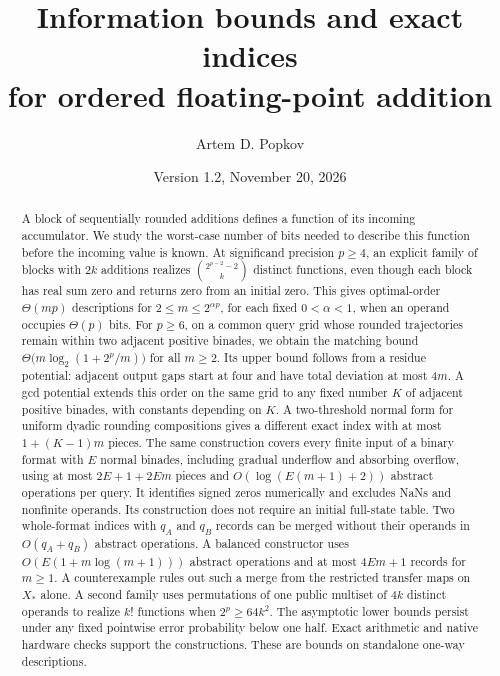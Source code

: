 \documentclass[11pt,reqno]{amsart}
\title[Ordered floating-point addition]{Information bounds and exact indices\protect\\ for ordered floating-point addition}
\author{Artem D. Popkov}
\date{Version 1.2, November 20, 2026}
\theoremstyle{definition}
\theoremstyle{remark}
\numberwithin{equation}{section}
\begin{document}
\raggedbottom

\begin{abstract}
A block of sequentially rounded additions defines a function of its incoming
accumulator. We study the worst-case number of bits needed to describe this
function before the incoming value is known. At significand precision $p\ge4$,
an explicit family of blocks with $2k$ additions realizes
$\binom{2^{p-2}-2}{k}$ distinct functions, even though each block has real sum
zero and returns zero from an initial zero. This gives optimal-order
$\Theta(mp)$ descriptions for $2\le m\le 2^{\alpha p}$, for each fixed
$0<\alpha<1$, when an operand occupies $\Theta(p)$ bits. For $p\ge6$, on a common query
grid whose rounded trajectories remain within two adjacent positive binades,
we obtain the matching bound $\Theta\bigl(m\log_2(1+2^p/m)\bigr)$ for all
$m\ge2$. Its upper bound follows from a residue potential: adjacent output
gaps start at four and have total deviation at most $4m$. A gcd potential
extends this order on the same grid to any fixed number $K$ of adjacent
positive binades, with constants depending on $K$. A two-threshold normal
form for uniform dyadic rounding compositions gives a different exact
index with at most $1+(K-1)m$ pieces. The same construction covers every
finite input of a binary format with $E$ normal binades, including gradual
underflow and absorbing overflow, using at most $2E+1+2Em$ pieces and
$O(\log(E(m+1)+2))$ abstract operations per query. It identifies signed
zeros numerically and excludes NaNs and nonfinite operands. Its construction
does not require an initial full-state table. Two whole-format indices with
$q_A$ and $q_B$ records can be merged without their operands in
$O(q_A+q_B)$ abstract operations. A balanced constructor uses
$O(E(1+m\log(m+1)))$ abstract operations and at most $4Em+1$ records
for $m\geq1$. A counterexample rules out such a merge from the restricted
transfer maps on $X_\ast$ alone. A second family
uses permutations of one public multiset of $4k$ distinct operands to realize
$k!$ functions when $2^p\ge64k^2$. The asymptotic lower bounds persist under any fixed
pointwise error probability below one half. Exact arithmetic and native
hardware checks support the constructions. These are bounds on standalone
one-way descriptions.
\end{abstract}

\maketitle
\end{document}
